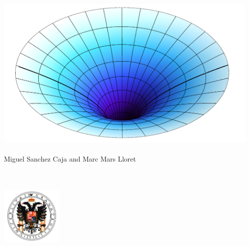 \begin{titlepage}
	\begin{addmargin}[-1cm]{-3cm}
    \begin{center}
        \large  

        \hfill

        \vfill

        \begingroup
            \color{Maroon}\spacedallcaps{\myTitle} \\ \bigskip
        \endgroup

        \spacedlowsmallcaps{\myName}

        \vfill

        \includegraphics[width=13cm]{gfx/Flamm.png} \\ \medskip
\vspace{3cm}
	 \begingroup
        \color{Maroon}\mySubtitle \\ \medskip  \medskip 
        \endgroup
        Miguel Sanchez Caja and Marc Mars Lloret \\                           
        \myFaculty \\
        \myUni \\ \bigskip

        

        \vfill                      

    \end{center}  
  \end{addmargin}  
  
  \hspace{5.7cm}  \includegraphics[width=3cm]{gfx/escudo.pdf}
  \newpage     
\end{titlepage}   